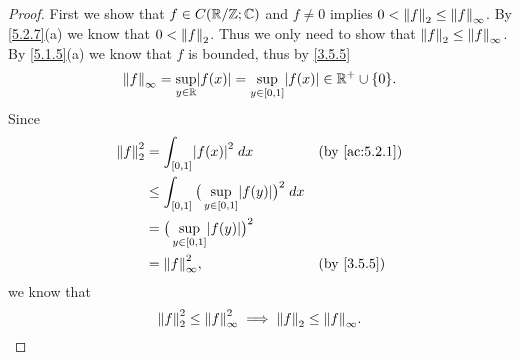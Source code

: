 \begin{proof}
  First we show that \(f \in C(\R / \Z ; \C)\) and \(f \neq 0\) implies \(0 < \norm*{f}_2 \leq \norm*{f}_{\infty}\).
  By \cref{5.2.7}(a) we know that \(0 < \norm*{f}_2\).
  Thus we only need to show that \(\norm*{f}_2 \leq \norm*{f}_\infty\).
  By \cref{5.1.5}(a) we know that \(f\) is bounded, thus by \cref{3.5.5}
  \[
    \norm*{f}_{\infty} = \sup_{y \in \R} \abs{f(x)} = \sup_{y \in [0, 1]} \abs{f(x)} \in \R^+ \cup \{0\}.
  \]
  Since
  \begin{align*}
    \norm*{f}_2^2 & = \int_{[0, 1]} \abs{f(x)}^2 \; dx                                  &  & \by{ac:5.2.1} \\
                  & \leq \int_{[0, 1]} \big(\sup_{y \in [0, 1]} \abs{f(y)}\big)^2 \; dx                    \\
                  & = \big(\sup_{y \in [0, 1]} \abs{f(y)}\big)^2                                           \\
                  & = \norm*{f}_{\infty}^2,                                             &  & \by{3.5.5}
  \end{align*}
  we know that
  \[
    \norm*{f}_2^2 \leq \norm*{f}_{\infty}^2 \implies \norm*{f}_2 \leq \norm*{f}_{\infty}.
  \]


\end{proof}
